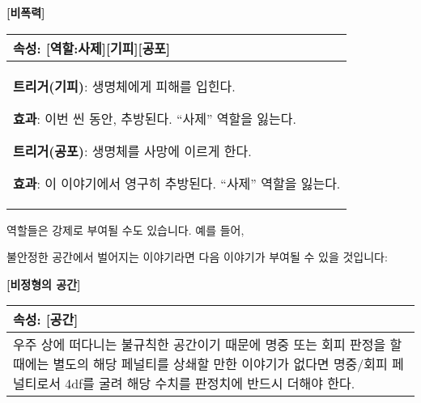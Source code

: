 \documentclass[12pt]{report}
\newenvironment{story}[2]
{\begin{center}
		{\large \textbf{[#1]}}\\[1ex]
		\begin{tabular}{|p{\textwidth}|}
			\hline
			\textbf{속성}: #2
			\\
			\hline
		}
		{ 
			\\\hline
		\end{tabular}
	\end{center}
}
\begin{document}
	\begin{story}{비폭력}{[역할:사제][기피][공포]}
		\textbf{트리거(기피)}: 생명체에게 피해를 입힌다.
		
		\textbf{효과}: 이번 씬 동안, 추방된다. “사제” 역할을 잃는다.

		\medskip

		\textbf{트리거(공포)}: 생명체를 사망에 이르게 한다.
		
		\textbf{효과}: 이 이야기에서 영구히 추방된다. “사제” 역할을 잃는다.
	\end{story}
	
	역할들은 강제로 부여될 수도 있습니다. 예를 들어,
\iffalse
	러브크래프트 세계관에 들어간 이야기꾼들은 다음과 같은 역할이 부여될 수 있습니다:
	\begin{story}{점점 미쳐가는 이야기}{[세계][설화][광기]}
		이성치 100을 얻는다. 일반적으로 이해할 수 없는 일(살인, 시체, 고대의 존재등)을 목격할때마다, 그 수준에 따라 난이도와 피해량(성공/실패, 다이스 사용 가능)을 시스템이 지정한다. 그러면 1d(현재 정신력)을 굴려, 해당 수치가 난이도 이상이라면 이성치에 성공 피해량을, 미만이라면 실패 피해량을 받는다. (e.g. 60[1d4/2d8]의 경우 주사위의 결과가 60 이상이 나오면 성공하며, 성공시 1d4 정신력, 실패시 2d8 정신력을 잃는다.)
		
		현재 이성치의 10\% 이상에 달하는 피해를 한번에 받은 이야기꾼은 해당 상황에 대한 이 시나리오에서의 [기피]를, 20\% 이상인 경우 이 시나리오에서의 [공포]를 얻는다. 25\% 이상인 경우, [공포]를 얻는 것은 같으나 이는 시나리오에서 벗어나도 유지된다. 이를 방지하기 위해 이성치에 받는 피해의 전부 또는 일부를 1대1의 비율로 정신력에 받을 수 있다.
	\end{story}
	또한, 
\fi
	불안정한 공간에서 벌어지는 이야기라면 다음 이야기가 부여될 수 있을 것입니다:
	\begin{story}{비정형의 공간}{[공간]}
		우주 상에 떠다니는 불규칙한 공간이기 때문에 명중 또는 회피 판정을 할 때에는 별도의 해당 페널티를 상쇄할 만한 이야기가 없다면 명중/회피 페널티로서 4df를 굴려 해당 수치를 판정치에 반드시 더해야 한다.
	\end{story}
	
\end{document}

